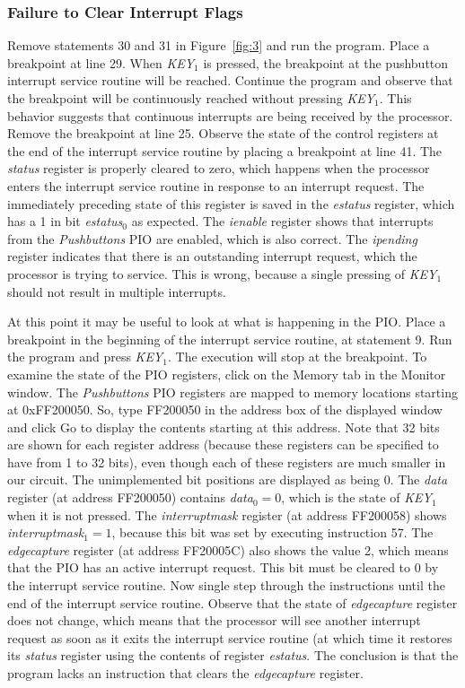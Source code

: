 \documentclass[11pt, twoside, pdftex]{article}
\begin{document}
\subsubsection{Failure to Clear Interrupt Flags}
Remove statements 30 and 31 in Figure~\ref{fig:3} and run the program. Place a breakpoint at line 29. When {\it KEY}$_1$ is
pressed, the breakpoint at the pushbutton interrupt service routine will be reached. Continue the program and observe that the breakpoint will be continuously reached without pressing {\it KEY}$_1$. This behavior suggests that continuous interrupts are being received
by the processor. Remove the breakpoint at line 25.
Observe the state of the control registers at the end of the interrupt service routine by placing a breakpoint at line 41.
The {\it status} register is properly cleared to zero, which happens when the
processor enters the interrupt service routine in response to an interrupt request.
The immediately preceding state of this register is saved in the {\it estatus}
register, which has a 1 in bit {\it estatus}$_0$ as expected.
The {\it ienable} register shows that interrupts from the {\it Pushbuttons}
PIO are enabled, which is also correct. The {\it ipending} register indicates
that there is an outstanding interrupt request, which the processor is trying
to service. This is wrong, because a single pressing of {\it KEY}$_1$ should not
result in multiple interrupts.

At this point it may be useful to look at what is happening in the PIO.
Place a breakpoint in the beginning of the interrupt service routine, 
at statement 9. Run the program and press {\it KEY}$_1$.
The execution will stop at the breakpoint. 
To examine the state of the PIO registers, click on the
{\sf Memory} tab in the Monitor window. The {\it Pushbuttons} PIO registers
are mapped to memory locations starting at 0xFF200050. So, type FF200050 in the
address box of the displayed window and click {\sf Go} to display
the contents starting at this address. Note that 32 bits are shown for
each register address (because these registers can be specified to have 
from 1 to 32 bits), even though each of these registers are much smaller in our circuit. The unimplemented bit positions are displayed as being 0.
The {\it data} register (at address FF200050) contains {\it data}$_0 = 0$, which
is the state of {\it KEY}$_1$ when it is not pressed. The {\it interruptmask} register (at address FF200058)
shows {\it interruptmask}$_1 = 1$, because this bit was set by executing 
instruction 57. The {\it edgecapture} register (at address FF20005C) also 
shows the value 2, which means that the PIO has an active interrupt request.
This bit must be cleared to 0 by the interrupt service routine.
Now single step through the instructions until the end of the interrupt service routine.
Observe that the state of {\it edgecapture} register does not change, which means
that the processor will see another interrupt request as soon as it
exits the interrupt service routine (at which time it restores its {\it status}
register using the contents of register {\it estatus}.
The conclusion is that the program lacks an instruction that clears the
{\it edgecapture} register. 
\end{document}
